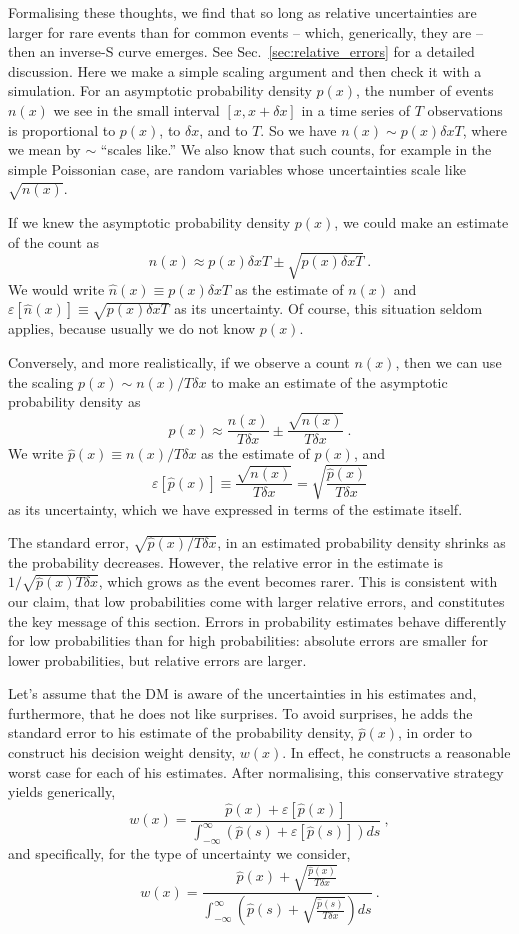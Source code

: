 \documentclass[a4paper, 12pt]{article}
\newcommand{\elabel}[1]{\label{eq:#1}}
\newcommand{\secref}[1]{Sec.~\ref{sec:#1}}
\newcommand{\be}{\begin{equation}}
\newcommand{\ee}{\end{equation}}
\newcommand{\err}[1]{\varepsilon\left[#1\right]}
\newcommand{\phat}{\hat{p}}
\newcommand{\nhat}{\hat{n}}
\begin{document}
Formalising these thoughts, we find that so long as relative uncertainties are larger for rare events than for common events -- which, generically, they are -- then an inverse-S curve emerges. See \secref{relative_errors} for a detailed discussion. Here we make a simple scaling argument and then check it with a simulation. For an asymptotic probability density $p(x)$, the number of events $n(x)$ we see in the small interval $[x, x+ \delta x]$ in a time series of $T$ observations is proportional to $p(x)$, to $\delta x$, and to $T$. So we have $n(x) \sim p(x) \delta x T$, where we mean by $\sim$ ``scales like.'' We also know that such counts, for example in the simple Poissonian case, are random variables whose uncertainties scale like $\sqrt{n(x)}$.

If we knew the asymptotic probability density $p(x)$, we could make an estimate of the count as
\be
n(x) \approx p(x) \delta x T \pm \sqrt{p(x) \delta x T} ~.
\elabel{count_est}
\ee
We would write $\nhat(x) \equiv p(x) \delta x T$ as the estimate of $n(x)$ and $\err{\nhat(x)} \equiv \sqrt{p(x) \delta x T}$ as its uncertainty. Of course, this situation seldom applies, because usually we do not know $p(x)$.

Conversely, and more realistically, if we observe a count $n(x)$, then we can use the scaling $ p(x) \sim n(x)/T\delta x$ to make an estimate of the asymptotic probability density as
\be
p(x) \approx \frac{n(x)}{T\delta x} \pm \frac{\sqrt{n(x)}}{T \delta x} ~.
\elabel{prob_est}
\ee
We write $\phat(x) \equiv n(x)/T\delta x$ as the estimate of $p(x)$, and
\be
\err{\phat(x)} \equiv \frac{\sqrt{n(x)}}{T \delta x} = \sqrt{\frac{\phat(x)}{T \delta x}}
\ee
as its uncertainty, which we have expressed in terms of the estimate itself.

The standard error, $ \sqrt{\phat(x)/T \delta x}$, in an estimated probability density shrinks as the probability decreases. However, the relative error in the estimate is $1/\sqrt{\phat(x)T\delta x}$, which grows as the event becomes rarer. This is consistent with our claim, that low probabilities come with larger relative errors, and constitutes the key message of this section. Errors in probability estimates behave differently for low probabilities than for high probabilities: absolute errors are smaller for lower probabilities, but relative errors are larger. 

Let's assume that the DM is aware of the uncertainties in his estimates and, furthermore, that he does not like surprises. To avoid surprises, he adds the standard error to his estimate of the probability density, $\phat(x)$, in order to construct his decision weight density, $w(x)$. In effect, he constructs a reasonable worst case for each of his estimates. After normalising, this conservative strategy yields generically,
\be
w(x) = \frac{\phat(x)+\err{\phat(x)}}{\int_{-\infty}^{\infty}\left(\phat(s)+\err{\phat(s)}\right)ds}~,
\elabel{weight_density_gen}
\ee
and specifically, for the type of uncertainty we consider,
\be
w(x)= \frac{\phat(x)+\sqrt{\frac{\phat(x)}{T \delta x}}}{\int_{-\infty}^{\infty}\left(\phat(s)+\sqrt{\frac{\phat(s)}{T \delta x}}\right)ds}~.
\elabel{weight_density_spec}
\ee
\end{document}
